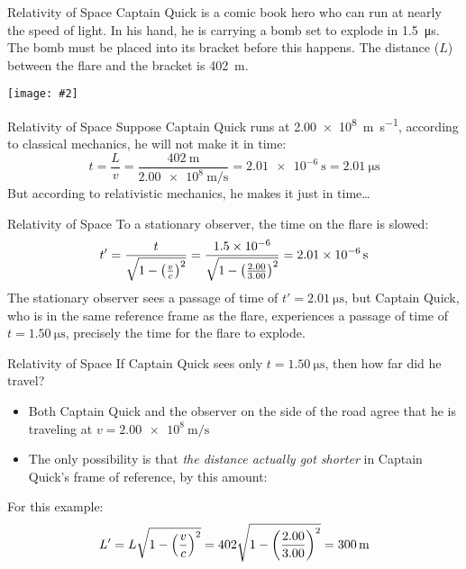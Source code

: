 \documentclass[12pt,compress,aspectratio=169]{beamer}
\newcommand{\pic}[2]{\texttt{[image: \#2]}}
\newcommand{\bigsqrt}{\ensuremath\sqrt{1-\left(\frac{v}{c}\right)^2}}
\newcommand{\eq}[2]{\vspace{#1}{\Large\begin{displaymath}#2\end{displaymath}}}
\begin{document}
\begin{frame}{Relativity of Space}
  Captain Quick is a comic book hero who can run at nearly the speed of light.
  In his hand, he is carrying a bomb set to explode in \SI{1.5}{\micro\second}.
  The bomb must be placed into its bracket before this happens. The distance
  ($L$) between the flare and the bracket is \SI{402}{\metre}.
  \begin{center}
    \pic{.7}{graphics/captain-quick}
  \end{center}
\end{frame}


\begin{frame}{Relativity of Space}
  Suppose Captain Quick runs at \SI{2.00e8}{\metre\per\second}, according to
  classical mechanics, he will not make it in time:
  \begin{displaymath}
    t= \frac{L}{v}=\frac{\SI{402}{\metre}}{\SI{2.00e8}{\metre\per\second}}
    =\SI{2.01e-6}{\second}=\SI{2.01}{\micro\second}
  \end{displaymath}
  But according to relativistic mechanics, he makes it just in time\ldots
\end{frame}


\begin{frame}{Relativity of Space}
  To a stationary observer, the time on the flare is slowed:
  \begin{displaymath}
    t'
    = \frac{t}{\bigsqrt}
    = \frac{\num{1.5e-6}}{\sqrt{1-\left(\frac{2.00}{3.00}\right)^2}}
    = \SI{2.01e-6}{\second}
  \end{displaymath}
  The stationary observer sees a passage of time of
  $t'=\SI{2.01}{\micro\second}$, but Captain Quick, who is in the same
  reference frame as the flare, experiences a passage of time of
  $t=\SI{1.50}{\micro\second}$, precisely the time for the flare to explode.
\end{frame}


\begin{frame}{Relativity of Space}
  If Captain Quick sees only $t=\SI{1.50}{\micro\second}$, then how far did he
  travel?
  \begin{itemize}
  \item Both Captain Quick and the observer on the side of the road agree that
    he is traveling at $v=\SI{2.00e8}{\metre\per\second}$
  \item The only possibility is that \emph{the distance actually got shorter}
    in Captain Quick's frame of reference, by this amount:
    
    \eq{-.2in}{
      \boxed{L'=L\bigsqrt}
    }
  \end{itemize}
  For this example:
  \begin{displaymath}
    L'=L\bigsqrt=402\sqrt{1-\left(\frac{2.00}{3.00}\right)^2}=\SI{300}{\metre}
  \end{displaymath}
\end{frame}
\end{document}
